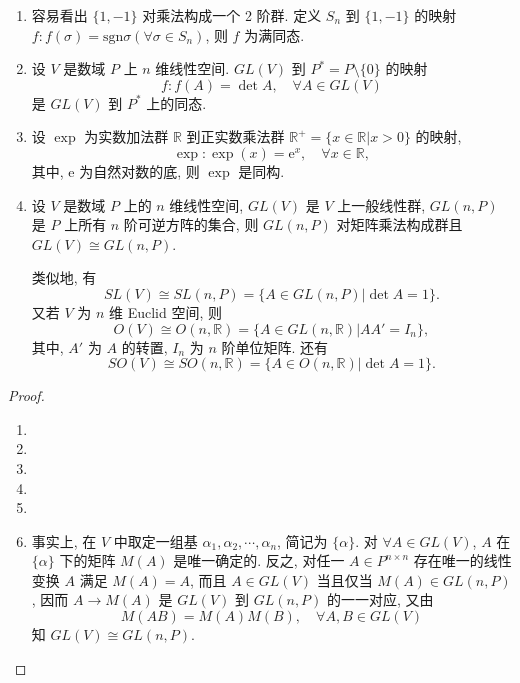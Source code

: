 \documentclass[../../main.tex]{subfiles}%
\begin{document}
\begin{example}
\begin{enumerate}[(1)]
\item 容易看出 \( \{1,-1\} \) 对乘法构成一个 2 阶群. 定义 \( S_n \) 到 \( \{1,-1\} \) 的映射 \( f: f(\sigma) = \text{sgn}\sigma (\forall \sigma \in S_n) \), 则 \( f \) 为满同态.

\item 设 \( V \) 是数域 \( P \) 上 \( n \) 维线性空间. \( GL(V) \) 到 \( P^* = P \setminus \{0\} \) 的映射
\[
f: f(A) = \det A, \quad \forall A \in GL(V)
\]
是 \( GL(V) \) 到 \( P^* \) 上的同态.

\item 设 \( \exp \) 为实数加法群 \( \mathbb{R} \) 到正实数乘法群 \( \mathbb{R}^+ = \{x \in \mathbb{R}|x > 0\} \) 的映射,
\[
\exp: \exp(x) = \text{e}^x, \quad \forall x \in \mathbb{R},
\]
其中, \( \text{e} \) 为自然对数的底, 则 \( \exp \) 是同构.

\item 设 \( V \) 是数域 \( P \) 上的 \( n \) 维线性空间, \( GL(V) \) 是 \( V \) 上一般线性群, \( GL(n,P) \) 是 \( P \) 上所有 \( n \) 阶可逆方阵的集合, 则 \( GL(n,P) \) 对矩阵乘法构成群且 \( GL(V) \cong GL(n,P) \).

类似地, 有
\[
SL(V) \cong SL(n,P) = \{A \in GL(n,P)|\det A = 1\}.
\]
又若 \( V \) 为 \( n \) 维 Euclid 空间, 则
\[
O(V) \cong O(n,\mathbb{R}) = \{A \in GL(n,\mathbb{R})|AA' = I_n\},
\]
其中, \( A' \) 为 \( A \) 的转置, \( I_n \) 为 \( n \) 阶单位矩阵. 还有
\[
SO(V) \cong SO(n,\mathbb{R}) = \{A \in O(n,\mathbb{R})|\det A = 1\}.
\]
\end{enumerate}
\end{example}
\begin{proof}
\begin{enumerate}
\item 

\item 

\item 

\item 

\item 

\item 事实上, 在 \( V \) 中取定一组基 \( \alpha_1,\alpha_2,\cdots,\alpha_n \), 简记为 \( \{\alpha\} \). 对 \( \forall A \in GL(V) \), \( A \) 在 \( \{\alpha\} \) 下的矩阵 \( M(A) \) 是唯一确定的. 反之, 对任一 \( A \in P^{n \times n} \) 存在唯一的线性变换 \( A \) 满足 \( M(A) = A \), 而且 \( A \in GL(V) \) 当且仅当 \( M(A) \in GL(n,P) \), 因而 \( A \to M(A) \) 是 \( GL(V) \) 到 \( GL(n,P) \) 的一一对应, 又由
\[
M(AB) = M(A)M(B), \quad \forall A,B \in GL(V)
\]
知 \( GL(V) \cong GL(n,P) \).
\end{enumerate}

\end{proof}
\end{document}
